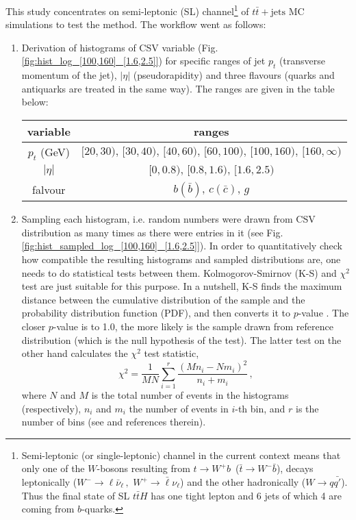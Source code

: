 \documentclass[12pt,a4paper]{article}
\begin{document}
This study concentrates on semi-leptonic (SL) channel\footnote{Semi-leptonic (or single-leptonic) channel in the current context means that only one of the $W$-bosons resulting from $t\to W^+b\,$ ($\bar{t}\to W^-\bar{b}$), decays leptonically ($W^-\to \mathcal{\ell}\bar{\nu}_\mathcal{\ell}\,,\,\,W^+\to \bar{\mathcal{\ell}}\nu_\mathcal{\ell}$) and the other hadronically ($W\to q\bar{q'}$). Thus the final state of SL $t\bar{t}H$ has one tight lepton and 6 jets of which 4 are coming from $b$-quarks.}
of $t\bar{t}+\mbox{jets}$ MC simulations to test the method.
The workflow went as follows:
\begin{enumerate}
\item Derivation of histograms of CSV variable (Fig. \ref{fig:hist_log_[100,160]_[1.6,2.5]}) for specific ranges of jet $p_t$ (transverse momentum of the jet), $|\eta|$ (pseudorapidity) and three flavours (quarks and antiquarks are treated in the same way).
The ranges are given in the table below:
\begin{center}
	\begin{tabular}{ c | c }
		\hline
		variable & ranges \\ \hline
		$p_t$ (GeV) & $[20,30),\,[30,40),\,[40,60),\,[60,100),\,[100,160),\,[160,\infty)$ \\ \hline
		$|\eta|$ & $[0,0.8),\,[0.8,1.6),\,[1.6,2.5)$ \\ \hline
		falvour & $b(\bar{b})$, $c(\bar{c})$, $g$ \\
	\end{tabular}
\end{center}
\item Sampling each histogram, i.e. random numbers were drawn from CSV distribution as many times as there were entries in it (see Fig. \ref{fig:hist_sampled_log_[100,160]_[1.6,2.5]}).
In order to quantitatively check how compatible the resulting histograms and sampled distributions are, one needs to do statistical tests between them.
Kolmogorov-Smirnov (K-S) and $\chi^2$ test are just suitable for this purpose.
In a nutshell, K-S finds the maximum distance between the cumulative distribution of the sample and the probability distribution function (PDF), and then converts it to $p$-value \cite{ROOTKS}.
The closer $p$-value is to 1.0, the more likely is the sample drawn from reference distribution (which is the null hypothesis of the test).
The latter test on the other hand calculates the $\chi^2$ test statistic,
\[\chi^2 = \frac{1}{MN}\sum_{i = 1}^r\frac{(Mn_i - Nm_i)^2}{n_i + m_i}\,,\]
where $N$ and $M$ is the total number of events in the histograms (respectively), $n_i$ and $m_i$ the number of events in $i$-th bin, and $r$ is the number of bins  (see \cite{ROOTchi} and references therein).

\end{enumerate}
\end{document}
